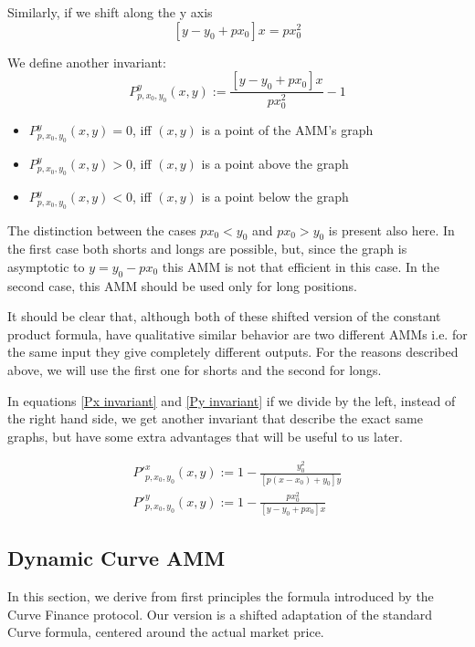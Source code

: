\documentclass{article}
\begin{document}
Similarly, if we shift along the y axis
\begin{equation}\label{Py invariant}
[y-y_0+px_0]x=px_0^2
\end{equation}

We define another invariant:
\begin{equation}
P^y_{p,x_0,y_0}(x,y) := \frac{[y-y_0+px_0]x}{px_0^2} - 1
\end{equation}

\begin{itemize}
\item $P^y_{p,x_0,y_0}(x,y) = 0$, iff $(x,y)$ is a point of the AMM's graph
\item $P^y_{p,x_0,y_0}(x,y) > 0$, iff $(x,y)$ is a point above the graph
\item $P^y_{p,x_0,y_0}(x,y) < 0$, iff $(x,y)$ is a point below the graph
\end{itemize}

The  distinction between the cases $px_0 < y_0$ and $px_0 > y_0$ is present also here. In the first case both shorts and longs are possible, but, since the graph is asymptotic to $y = y_0 -px_0$ this AMM is not that efficient in this case. In the second case, this AMM should be used only for long positions.

It should be clear that, although both of these shifted version of the constant product formula, have qualitative similar behavior are two different AMMs i.e. for the same input they give completely different outputs. For the reasons described above, we will use the first one for shorts and the second for longs.



In equations \ref{Px invariant} and \ref{Py invariant} if we divide by the left, instead of the right hand side, we get another invariant that describe the exact same graphs, but have some extra advantages that will be useful to us later.

\begin{align}
P'^x_{p,x_0,y_0}(x,y) := 1 - \frac{y_0^2}{[p(x-x_0)+y_0]y}  \\
P'^y_{p,x_0,y_0}(x,y) := 1 - \frac{px_0^2}{[y-y_0+px_0]x}
\end{align}


\subsection{Dynamic Curve AMM}

In this section, we derive from first principles the formula introduced by the Curve Finance protocol. Our version is a shifted adaptation of the standard Curve formula, centered around the actual market price.
\end{document}
